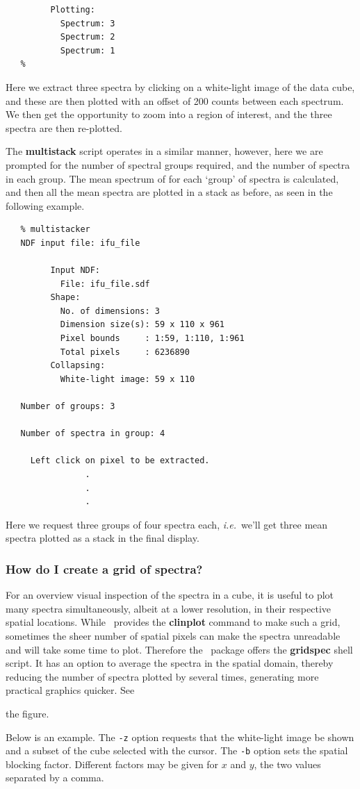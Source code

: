 \documentclass[twoside,11pt]{article}
\newcommand{\xref}[3]{#1}
\newcommand{\xlabel}[1]{}
\begin{document}
{\begin{verbatim}
         Plotting:
           Spectrum: 3
           Spectrum: 2
           Spectrum: 1
   %
\end{verbatim}\normalsize

Here we extract three spectra by clicking on a white-light image of
the data cube, and these are then plotted with an offset of 200 counts
between each spectrum.  We then get the opportunity to zoom into a
region of interest, and the three spectra are then re-plotted.

The {\bf multistack} script operates in a similar manner, however, here
we are prompted for the number of spectral groups required, and the
number of spectra in each group.  The mean spectrum of for each
`group' of spectra is calculated, and then all the mean spectra are
plotted in a stack as before, as seen in the following example. 

\small\begin{verbatim}
   % multistacker
   NDF input file: ifu_file
 
         Input NDF:
           File: ifu_file.sdf
         Shape:
           No. of dimensions: 3
           Dimension size(s): 59 x 110 x 961
           Pixel bounds     : 1:59, 1:110, 1:961
           Total pixels     : 6236890
         Collapsing:
           White-light image: 59 x 110
  
   Number of groups: 3
 
   Number of spectra in group: 4
  
     Left click on pixel to be extracted.
                .
                .
                .	     
\end{verbatim}\normalsize

Here we request three groups of four spectra each, \emph{i.e.}\ we'll
get three mean spectra plotted as a stack in the final display.

\subsubsection{\label{sc16_gridmap}How do I create a grid of
spectra?\xlabel{sc16_gridmap}}

For an overview visual inspection of the spectra in a cube, it is useful
to plot many spectra simultaneously, albeit at a lower resolution, in
their respective spatial locations.  While \KAPPA\ provides the
\xref{{\bf clinplot}}{sun95}{CLINPLOT} command to make such a grid, sometimes
the sheer number of spatial pixels can make the spectra unreadable and
will take some time to plot.  Therefore the \DATACUBE\ package
offers the \xref{{\bf gridspec}}{sun237}{gridspec} shell script.  It
has an option to average the spectra in the spatial domain, thereby
reducing the number of spectra plotted by several times, generating
more practical graphics quicker.   See
\begin{htmlonly}
the figure.
\end{htmlonly}
  Below is an
example.  The {\tt -z} option requests that the white-light image be
shown and a subset of the cube selected with the cursor. The {\tt -b}
option sets the spatial blocking factor.  Different factors may be
given for $x$ and $y$, the two values separated by a comma.

}
\end{document}
